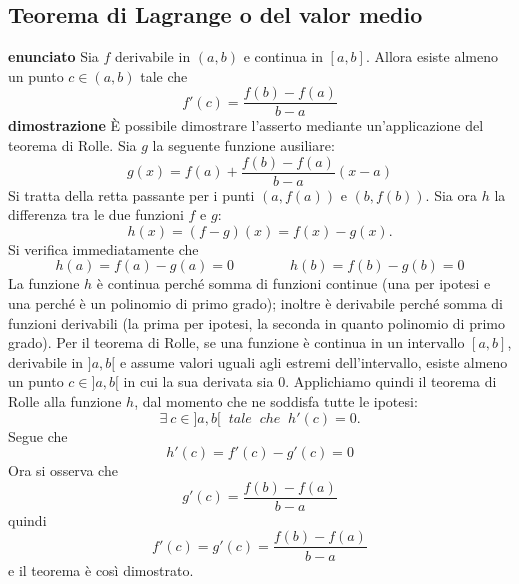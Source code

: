 \documentclass[a4paper, 9pt]{report}
\begin{document}
\subsection*{Teorema di Lagrange o del valor medio}
\textbf{enunciato}\newline
Sia $f$ derivabile in $(a,b)$ e continua in $[a,b]$. Allora esiste almeno un punto $c \in (a,b)$ tale che 
\[
    f'(c) = \frac{f(b)-f(a)}{b-a}
\]
\textbf{dimostrazione}\newline
È possibile dimostrare l'asserto mediante un'applicazione del teorema di Rolle.\newline
Sia $g$ la seguente funzione ausiliare:
\[
    g(x)=f(a)+\frac{f(b)-f(a)}{b-a}(x-a)
\] 
Si tratta della retta passante per i punti $(a,f(a))$ e $(b,f(b))$.\newline
Sia ora $h$ la differenza tra le due funzioni $f$ e $g$:
\[
    h(x) = (f-g)(x) = f(x) - g(x).
\]
Si verifica immediatamente che
\[
    h(a) = f(a) - g(a) = 0 \qquad \qquad h(b) = f(b) - g(b) = 0
\]
La funzione $h$ è continua perché somma di funzioni continue (una per ipotesi e una perché è un polinomio di primo grado); inoltre è derivabile perché somma di funzioni derivabili (la prima per ipotesi, la seconda in quanto polinomio di primo grado).\newline
Per il teorema di Rolle, se una funzione è continua in un intervallo $[a,b]$, derivabile in $]a,b[$ e assume valori uguali agli estremi dell'intervallo, esiste almeno un punto $c\in ]a,b[$ in cui la sua derivata sia $0$.\newline
Applichiamo quindi il teorema di Rolle alla funzione $h$, dal momento che ne soddisfa tutte le ipotesi:
\[
    \exists \ c\in ]a,b[\;\;tale \;\; che \;\; h'(c)=0.
\]
Segue che
\[
    h'(c)=f'(c)-g'(c)=0
\]
Ora si osserva che
\[
    g'(c) = \frac{f(b) - f(a)}{b-a}  
\]
quindi
\[
    f'(c) = g'(c) =  \frac{f(b) - f(a)}{b-a}
\]
e il teorema è così dimostrato.





\newpage
\end{document}
